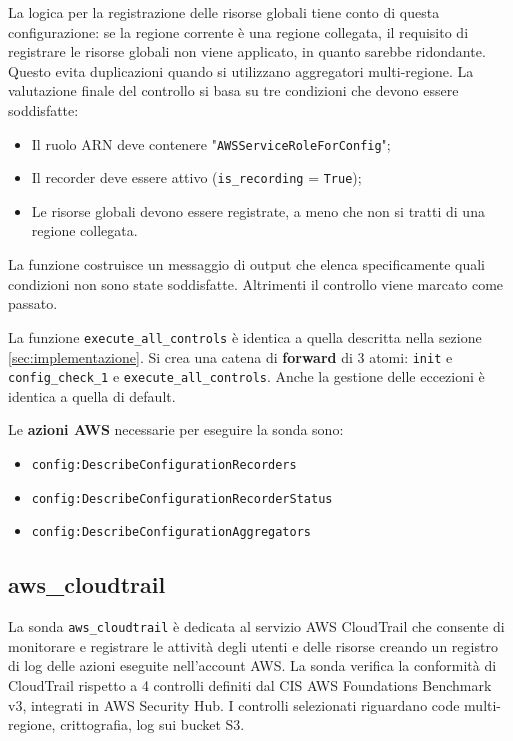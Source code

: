 La logica per la registrazione delle risorse globali tiene conto di questa configurazione: se la regione corrente è una regione collegata, il requisito di registrare le risorse globali non viene applicato, in quanto sarebbe ridondante. Questo evita duplicazioni quando si utilizzano aggregatori multi-regione. La valutazione finale del controllo si basa su tre condizioni che devono essere soddisfatte:

\begin{itemize}
\item Il ruolo ARN deve contenere "\texttt{AWSServiceRoleForConfig}";
\item Il recorder deve essere attivo (\texttt{is\_recording} = \texttt{True});
\item Le risorse globali devono essere registrate, a meno che non si tratti di una regione collegata.
\end{itemize}

La funzione costruisce un messaggio di output che elenca specificamente quali condizioni non sono state soddisfatte. Altrimenti il controllo viene marcato come passato. 

La funzione \texttt{execute\_all\_controls} è identica a quella descritta nella sezione \ref{sec:implementazione}. Si crea una catena di \textbf{forward} di 3 atomi: \texttt{init} e \texttt{config\_check\_1} e \texttt{execute\_all\_controls}. Anche la gestione delle eccezioni è identica a quella di default.

\vspace{1em}

\noindent Le \textbf{azioni AWS} necessarie per eseguire la sonda sono:
\begin{itemize}
    \item \texttt{config:DescribeConfigurationRecorders}
    \item \texttt{config:DescribeConfigurationRecorderStatus}
    \item \texttt{config:DescribeConfigurationAggregators}
\end{itemize}

\subsection{aws\_cloudtrail}
\label{sec:cloudtrail}

La sonda \texttt{aws\_cloudtrail} è dedicata al servizio AWS CloudTrail che consente di monitorare e registrare le attività degli utenti e delle risorse creando un registro di log delle azioni eseguite nell'account AWS. La sonda verifica la conformità di CloudTrail rispetto a 4 controlli definiti dal CIS AWS Foundations Benchmark v3, integrati in AWS Security Hub. I controlli selezionati riguardano code multi-regione, crittografia, log sui bucket S3.

